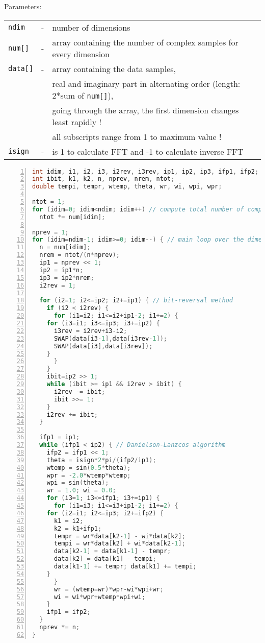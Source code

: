 Parameters:\\
\begin{tabular}{lcl}
\texttt{ndim}   & - & number of dimensions\\
\texttt{num[]}  & - & array containing the number of complex samples for every dimension\\
\texttt{data[]} & - & array containing the data samples,\\
                &   & real and imaginary part in alternating order (length: 2*sum of \texttt{num[]}),\\
                &   & going through the array, the first dimension changes least rapidly !\\
                &   & all subscripts range from 1 to maximum value !\\
\texttt{isign}  & - & is 1 to calculate FFT and -1 to calculate inverse FFT
\end{tabular}

\addvspace{12pt}

\begin{lstlisting}[language=C++,
    caption={multidimensional FFT algorithm in C},
    numbers=left,
    basicstyle=\small,
    frame=single,
    fontadjust]
int idim, i1, i2, i3, i2rev, i3rev, ip1, ip2, ip3, ifp1, ifp2;
int ibit, k1, k2, n, nprev, nrem, ntot;
double tempi, tempr, wtemp, theta, wr, wi, wpi, wpr;

ntot = 1;
for (idim=0; idim<ndim; idim++) // compute total number of complex values
  ntot *= num[idim];

nprev = 1;
for (idim=ndim-1; idim>=0; idim--) { // main loop over the dimensions
  n = num[idim];
  nrem = ntot/(n*nprev);
  ip1 = nprev << 1;
  ip2 = ip1*n;
  ip3 = ip2*nrem;
  i2rev = 1;

  for (i2=1; i2<=ip2; i2+=ip1) { // bit-reversal method
    if (i2 < i2rev) {
      for (i1=i2; i1<=i2+ip1-2; i1+=2) {
	for (i3=i1; i3<=ip3; i3+=ip2) {
	  i3rev = i2rev+i3-i2;
	  SWAP(data[i3-1],data[i3rev-1]);
	  SWAP(data[i3],data[i3rev]);
	}
      }
    }
    ibit=ip2 >> 1;
    while (ibit >= ip1 && i2rev > ibit) {
      i2rev -= ibit;
      ibit >>= 1;
    }
    i2rev += ibit;
  }

  ifp1 = ip1;
  while (ifp1 < ip2) { // Danielson-Lanzcos algorithm
    ifp2 = ifp1 << 1;
    theta = isign*2*pi/(ifp2/ip1);
    wtemp = sin(0.5*theta);
    wpr = -2.0*wtemp*wtemp;
    wpi = sin(theta);
    wr = 1.0; wi = 0.0;
    for (i3=1; i3<=ifp1; i3+=ip1) {
      for (i1=i3; i1<=i3+ip1-2; i1+=2) {
	for (i2=i1; i2<=ip3; i2+=ifp2) {
	  k1 = i2;
	  k2 = k1+ifp1;
	  tempr = wr*data[k2-1] - wi*data[k2];
	  tempi = wr*data[k2] + wi*data[k2-1];
	  data[k2-1] = data[k1-1] - tempr;
	  data[k2] = data[k1] - tempi;
	  data[k1-1] += tempr; data[k1] += tempi;
	}
      }
      wr = (wtemp=wr)*wpr-wi*wpi+wr;
      wi = wi*wpr+wtemp*wpi+wi;
    }
    ifp1 = ifp2;
  }
  nprev *= n;
}
\end{lstlisting}


